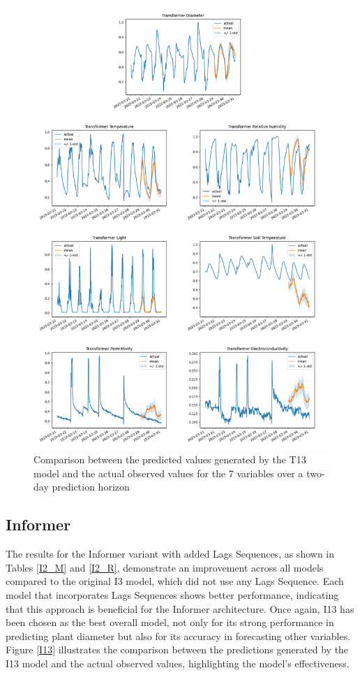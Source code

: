 \begin{figure}[htbp]
    \centering
    \includegraphics[width=15 cm]{6_ChapterResults/figuras/T13.png}
    \caption{Comparison between the predicted values generated by the T13 model and the actual observed values for the 7 variables over a two-day prediction horizon}
    \label{T13}
\end{figure}
    

\subsection{Informer}
The results for the Informer variant with added Lags Sequences, as shown in Tables \ref{I2_M} and \ref{I2_R}, demonstrate an improvement across all models compared to the original I3 model, which did not use any Lags Sequence. Each model that incorporates Lags Sequences shows better performance, indicating that this approach is beneficial for the Informer architecture. Once again, I13 has been chosen as the best overall model, not only for its strong performance in predicting plant diameter but also for its accuracy in forecasting other variables. Figure \ref{I13} illustrates the comparison between the predictions generated by the I13 model and the actual observed values, highlighting the model's effectiveness.

